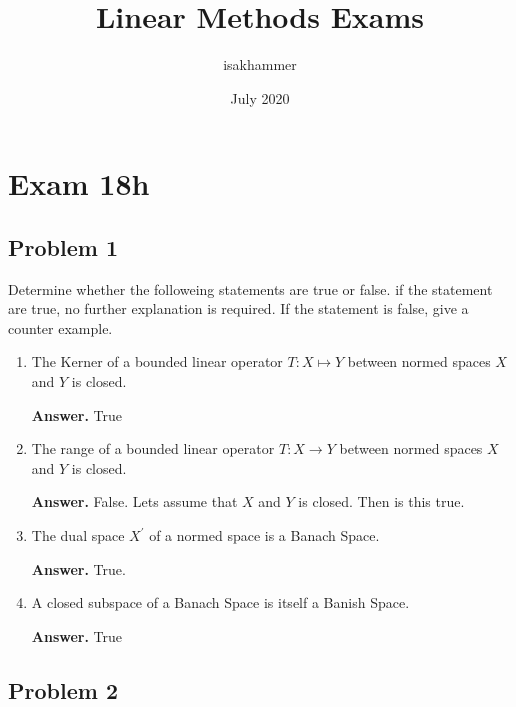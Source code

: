 \documentclass{article}
\title{Linear Methods Exams}
\author{isakhammer }
\date{July 2020}
\theoremstyle{remark}
\begin{document}
\maketitle
\tableofcontents
\newpage

\section{Exam 18h}%
\label{sec:exam_18h}

\subsection{Problem 1}%
\label{sub:problem_1}


Determine whether the followeing statements are true or false. if the statement are true, no further explanation is required. If the statement is false, give a counter example.

  \begin{enumerate}
    \item The Kerner of a bounded linear operator $T: X \mapsto Y$ between normed spaces $X$ and $Y$ is closed.
      \begin{tcolorbox}
        \textbf{Answer.}  
        True
      \end{tcolorbox}
    \item The range of a bounded linear operator $T: X \to Y$ between normed spaces $X$ and $Y$ is closed.
      \begin{tcolorbox}
        \textbf{Answer.} 
      False. Lets assume that $X$ and $Y$ is closed. Then is this true. 
      \end{tcolorbox}
    \item The dual space $X^{'}$ of a normed space is a Banach Space.
      \begin{tcolorbox}
        \textbf{Answer.} 
        True.
      \end{tcolorbox}

    \item A closed subspace of a Banach Space is itself a Banish Space.
      \begin{tcolorbox}
        \textbf{Answer.} 
          True
      \end{tcolorbox}
  \end{enumerate}

\subsection{Problem 2}%
\label{sub:problem_2}
\end{document}
